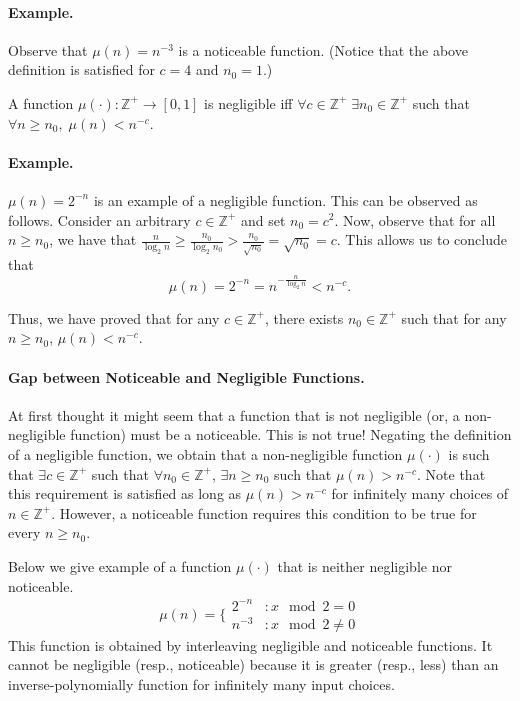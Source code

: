 \documentclass[12pt]{tufte-book}
\begin{document}
\paragraph{Example.} Observe that $\mu(n) = n^{-3}$ is a noticeable function.  (Notice that the above definition is satisfied for $c = 4$ and $n_0 = 1$.)

\begin{definition}
A function $\mu(\cdot): \mathbb{Z}^+ \rightarrow [0,1]$ is negligible iff $\forall c \in \mathbb{Z}^+ \; \exists n_0 \in \mathbb{Z}^+$ such that $\forall n \geq n_0 , \; \mu(n) < n^{-c}$.
\end{definition}

\paragraph{Example.} $\mu(n) = 2^{-n}$ is an example of a negligible function. This can be observed as follows.
Consider an arbitrary $c \in \mathbb{Z}^+$ and set $n_0 = c^2$. Now, observe that for all $n \geq n_0$, we have that $\frac{n}{\log_2 n} \geq \frac{n_0}{\log_2 n_0} > \frac{n_0}{\sqrt{n_0}} = \sqrt{n_0} = c$. This allows us to conclude that $$\mu(n) = 2^{-n} = n^{-\frac{n}{\log_2 n}} < n^{-c}.$$

Thus, we have proved that for any $c \in \mathbb{Z}^+$, there exists $n_0 \in \mathbb{Z}^+$ such that for any $n \geq n_0$, $\mu(n) < n^{-c}$.

\paragraph{Gap between Noticeable and Negligible Functions.}
At first thought it might seem that a function that is {not} negligible (or, a non-negligible function) must be a noticeable. This is not true!\cite{JC:Bellare02} Negating the definition of a negligible function, we obtain that a non-negligible function $\mu(\cdot)$ is such that $\exists c \in \mathbb{Z}^+$ such that $\forall n_0 \in \mathbb{Z}^+$, $\exists n \geq n_0$ such that $\mu(n) > n^{-c}$.
Note that this requirement is satisfied as long as $\mu(n) > n^{-c}$ for infinitely many choices of $n \in \mathbb{Z}^+$. However, a noticeable function requires this condition to be true for every $n \geq n_0$.

Below we give example of a function $\mu(\cdot)$ that is neither negligible nor noticeable.
$$\mu(n) = \Big\{
\begin{array}{ll}
  2^{-n} & : x \mod 2 = 0\\
  n^{-3} & : x \mod 2 \neq 0
\end{array}
$$
This function is obtained by interleaving negligible and  noticeable functions. It cannot be negligible (resp., noticeable) because it is greater (resp., less) than an inverse-polynomially function for infinitely many input choices.
\end{document}

